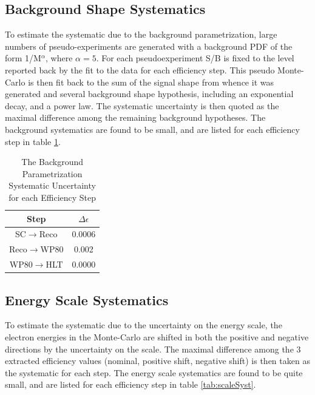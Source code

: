 \subsection{Background Shape Systematics}

To estimate the systematic due to the background parametrization, large numbers of pseudo-experiments are generated with a background PDF of the form 1/M$^{\alpha}$, 
where $\alpha=5$.  For each pseudoexperiment S/B is  fixed to the level reported back by the fit to the data for each efficiency step.
This pseudo Monte-Carlo is then fit back to the sum of the signal shape from whence it was generated and several background shape hypothesis, including an exponential decay,
and a power law. 
The systematic uncertainty is then quoted as the maximal difference among the remaining background hypotheses.  The background systematics are found to be small, and
are listed for each efficiency step in table \ref{tab:bkgSyst}. 


\begin{table}
  \begin{center}
    \caption{The Background Parametrization Systematic Uncertainty for each Efficiency Step}
    \label{tab:bkgSyst}
    \vskip 2mm
    \begin{tabular}{c|c}\hline \hline
      Step            & $\Delta\epsilon$ \\ \hline
      SC$\to$Reco     & 0.0006 \\
      Reco$\to$WP80     & 0.002 \\
      WP80$\to$HLT     & 0.0000 \\ \hline
    \end{tabular}
  \end{center}
\end{table}

\subsection{Energy Scale Systematics}
To estimate the systematic due to the uncertainty on the energy scale, the electron energies in the Monte-Carlo are shifted in 
both the positive and negative directions by the uncertainty on the scale.  The maximal difference among the 3 extracted efficiency values
(nominal, positive shift, negative shift) is then taken as the systematic for each step.  The energy scale systematics are found to be quite small, and 
are listed for each efficiency step in table \ref{tab:scaleSyst}.

